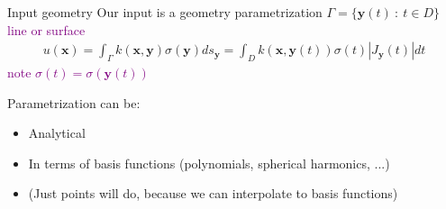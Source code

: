 \documentclass[t]{beamer}
\newcommand{\mbf}[1]{{\bm #1}}           %
\newcommand{\com}[1]{{\scriptsize \textcolor{purple}{#1}}}      %
\newcommand{\vg}{\vspace{2ex}}
\newcommand{\xx}{\mbf{x}}
\newcommand{\yy}{\mbf{y}}
\begin{document}
\begin{frame}{Input geometry}
  Our input is a geometry parametrization
  $\Gamma = \{\yy(t) \::\: t \in D\}$ \com{line or surface}
  \begin{align}
    u(\xx) = 
    \int_\Gamma k(\xx, \yy) \sigma(\yy) ds_\yy
    =
    \int_D k(\xx, \yy(t)) \sigma(t) |J_\yy(t)|dt
  \end{align}
  \hfill\com{note $\sigma(t) = \sigma(\yy(t))$}

  \pause
  \vg
  Parametrization can be:
  \begin{itemize}
  \item Analytical
  \item In terms of basis functions (polynomials, spherical harmonics, ...)
  \item (Just points will do, because we can interpolate to basis functions)
  \end{itemize}
\end{frame}
\end{document}
